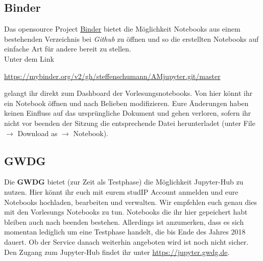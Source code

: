 \documentclass[oneside,bibliography=totoc,listof=totoc,BCOR=5mm,DIV=12,colorlinks=true,linkcolor=blue,citecolor=black, urlcolor=blue]{article}
\begin{document}
\subsection{Binder}
\label{sec:orgce45b28}
\noindent Das opensource Project \href{https://mybinder.org}{Binder} bietet die Möglichkeit Notebooks aus einem bestehenden Verzeichnis bei \emph{Github} zu öffnen und so die erstellten Notebooks auf einfache Art für andere bereit zu stellen.
\\
\noindent Unter dem Link
\begin{center}\url{https://mybinder.org/v2/gh/steffenschumann/AMjupyter.git/master}\end{center} gelangt ihr direkt zum Dashboard der Vorlesungsnotebooks.
Von hier könnt ihr ein Notebook öffnen und nach Belieben modifizieren. 
Eure Änderungen haben keinen Einfluss auf das ursprüngliche Dokument und gehen verloren, sofern ihr nicht vor beenden der Sitzung die entsprechende Datei herunterladet (unter File \(\rightarrow\) Download as \(\rightarrow\) Notebook).


\subsection{GWDG}
\label{sec:org83601c7}

Die \textbf{GWDG} bietet (zur Zeit als Testphase) die Möglichkeit Jupyter-Hub zu nutzen. Hier könnt ihr euch mit eurem studIP Account anmelden und eure Notebooks hochladen, bearbeiten und verwalten.
\noindent Wir empfehlen euch genau dies mit den Vorlesungs Notebooks zu tun. Notebooks die ihr hier gepeichert habt bleiben auch nach beenden bestehen. Allerdings ist anzumerken, dass es sich momentan lediglich um eine Testphase handelt, die bis Ende des Jahres 2018 dauert. Ob der Service danach weiterhin angeboten wird ist noch nicht sicher.\\
\noindent Den Zugang zum Jupyter-Hub findet ihr unter \url{https://jupyter.gwdg.de}. 
\end{document}
